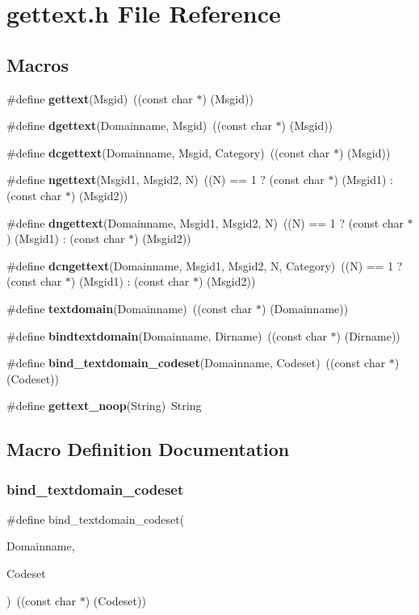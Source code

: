 \section{gettext.\+h File Reference}
\label{gettext_8h}
\subsection*{Macros}
\begin{DoxyCompactItemize}
\item 
\#define \textbf{ gettext}(Msgid)~((const char $\ast$) (Msgid))
\item 
\#define \textbf{ dgettext}(Domainname,  Msgid)~((const char $\ast$) (Msgid))
\item 
\#define \textbf{ dcgettext}(Domainname,  Msgid,  Category)~((const char $\ast$) (Msgid))
\item 
\#define \textbf{ ngettext}(Msgid1,  Msgid2,  N)~((N) == 1 ? (const char $\ast$) (Msgid1) \+: (const char $\ast$) (Msgid2))
\item 
\#define \textbf{ dngettext}(Domainname,  Msgid1,  Msgid2,  N)~((N) == 1 ? (const char $\ast$) (Msgid1) \+: (const char $\ast$) (Msgid2))
\item 
\#define \textbf{ dcngettext}(Domainname,  Msgid1,  Msgid2,  N,  Category)~((N) == 1 ? (const char $\ast$) (Msgid1) \+: (const char $\ast$) (Msgid2))
\item 
\#define \textbf{ textdomain}(Domainname)~((const char $\ast$) (Domainname))
\item 
\#define \textbf{ bindtextdomain}(Domainname,  Dirname)~((const char $\ast$) (Dirname))
\item 
\#define \textbf{ bind\+\_\+textdomain\+\_\+codeset}(Domainname,  Codeset)~((const char $\ast$) (Codeset))
\item 
\#define \textbf{ gettext\+\_\+noop}(String)~String
\end{DoxyCompactItemize}


\subsection{Macro Definition Documentation}
\mbox{\label{gettext_8h_a973ce74418a69a456534d48dedddcd46}} 
\subsubsection{bind\+\_\+textdomain\+\_\+codeset}
{\footnotesize\ttfamily \#define bind\+\_\+textdomain\+\_\+codeset(\begin{DoxyParamCaption}\item[{}]{Domainname,  }\item[{}]{Codeset }\end{DoxyParamCaption})~((const char $\ast$) (Codeset))}


